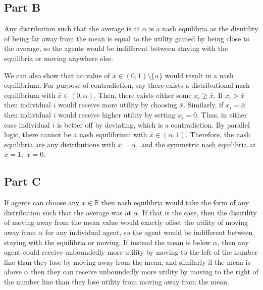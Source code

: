 \documentclass[11pt]{article} %
\begin{document}
\subsection{Part B}
Any distribution such that the average is at $\alpha$ is a nash equilibria as the disutility of being far away from the mean is equal to the utility gained by being close to the average, so the agents would be indifferent between staying with the equilibria or moving anywhere else.

We can also show that no value of $\bar{x} \in (0,1) \setminus \{ \alpha\}$ would result in a nash equilibrium. For purpose of contradiction, say there exists a distributional nash equilibrium with $\bar{x} \in (0,\alpha).$ Then, there exists either some $x_i \geq \bar{x}$. If $x_i>\bar{x}$ then individual $i$ would receive more utility by choosing $\bar{x}.$ Similarly, if $x_i = \bar{x}$ then individual $i$ would receive higher utility by setting $x_i = 0$. Thus, in either case individual $i$ is better off by deviating, which is a contradiction. By parallel logic, there cannot be a nash equilibrium with  $\bar{x} \in (\alpha,1).$ Therefore, the nash equilibria are any distributions with $\bar{x} = \alpha,$ and the symmetric nash equilibria at $\bar{x} = 1,$ $\bar{x} = 0.$
\subsection{Part C}
If agents can choose any $x\in \mathbb{R}$ then nash equilibria would take the form of any distribution such that the average was at $\alpha$. If that is the case, then the disutility of moving away from the mean value would exactly offset the utility of moving away from $\alpha$ for any individual agent, so the agent would be indifferent between staying with the equilibria or moving. If instead the mean is below $\alpha$, then any agent could receive unboundedly more utility by moving to the left of the number line than they lose by moving away from the mean, and similarly if the mean is above $\alpha$ then they can receive unboundedly more utility by moving to the right of the number line than they lose utility from moving away from the mean.
\end{document}
